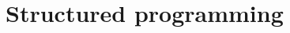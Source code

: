 \documentclass[springer.tex]{subfiles}
\begin{document}
\part{Structured programming}
\label{part:structured}
\end{document}
